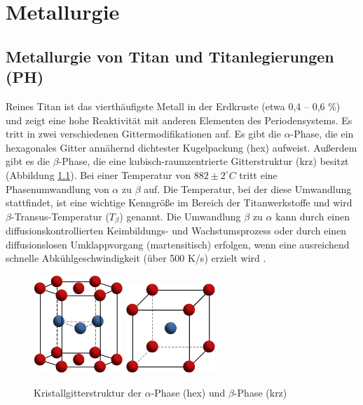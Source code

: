 \chapter{Metallurgie}	

\section{Metallurgie von Titan und Titanlegierungen (PH)}
\label{Titanallg}

Reines Titan ist das vierthäufigste Metall in der Erdkruste (etwa 0,4 -- 0,6 \%) und zeigt eine hohe Reaktivität mit anderen Elementen des Periodensystems. Es tritt in zwei verschiedenen Gittermodifikationen auf. Es gibt die $\alpha$-Phase, die ein hexagonales Gitter annähernd dichtester Kugelpackung (hex) aufweist. Außerdem gibt es die $\beta$-Phase, die eine kubisch-raumzentrierte Gitterstruktur (krz) besitzt (Abbildung \ref{fig:Kristallgitter}). Bei einer Temperatur von $882 \pm 2 ^\circ C$ tritt eine Phasenumwandlung von $\alpha$ zu $\beta$ auf. Die Temperatur, bei der diese Umwandlung stattfindet, ist eine wichtige Kenngröße im Bereich der Titanwerkstoffe und wird $\beta$-Transus-Temperatur ($T_{\beta}$) genannt.
Die Umwandlung $\beta$ zu $\alpha$ kann durch einen diffusionskontrollierten Keimbildungs- und Wachstumsprozess oder durch einen diffusionslosen Umklappvorgang (martensitisch) erfolgen, wenn eine ausreichend schnelle Abkühlgeschwindigkeit (über 500 K/s) erzielt wird \cite{C.Leyens.2005,Lutjering.2007}.

\begin{figure}[h]
	\centering
	\subfloat{}
	\includegraphics[width=0.3\textwidth]{./Bilder/hcp}
	\hspace{4ex}
	\subfloat{}
	\includegraphics[width=0.3\textwidth]{Bilder/krz}
	\caption{Kristallgitterstruktur der $\alpha$-Phase (hex) und $\beta$-Phase (krz)}
	\label{fig:Kristallgitter}
\end{figure}

